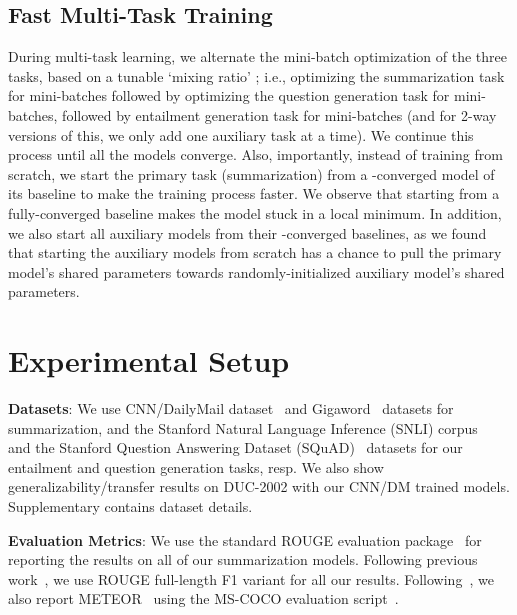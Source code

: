 \documentclass[11pt,a4paper]{article}
\begin{document}
\subsection{Fast Multi-Task Training}
During multi-task learning, we alternate the mini-batch optimization of the three tasks, based on a tunable `mixing ratio' ; i.e., optimizing the summarization task for  mini-batches followed by optimizing the question generation task for  mini-batches, followed by entailment generation task for  mini-batches (and for 2-way versions of this, we only add one auxiliary task at a time). We continue this process  until all the models converge. Also, importantly, instead of training from scratch, we start the primary task (summarization) from a -converged model of its baseline to make the training process faster. We observe that starting from a fully-converged baseline makes the model stuck in a local minimum. In addition, we also start all auxiliary models from their -converged baselines, as we found that starting the auxiliary models from scratch has a chance to pull the primary model's shared parameters towards randomly-initialized auxiliary model's shared parameters.




 
\section{Experimental Setup}
\label{sec-setup}

\label{sec:datasets}
\noindent\textbf{Datasets}: We use CNN/DailyMail dataset~\cite{hermann2015teaching,nallapati2016abstractive} and Gigaword~\cite{rush2015neural} datasets for summarization, and the Stanford Natural Language Inference (SNLI) corpus~\cite{bowman2015large} and the Stanford Question Answering Dataset (SQuAD)~\cite{rajpurkar2016squad} datasets for our entailment and question generation tasks, resp. We also show generalizability/transfer results on DUC-2002 with our CNN/DM trained models. Supplementary contains dataset details.

\noindent\textbf{Evaluation Metrics}: We use the standard ROUGE evaluation package~\cite{lin2004rouge} for reporting the results on all of our summarization models. Following previous work~\cite{chopra2016abstractive,nallapati2016abstractive}, we use ROUGE full-length F1 variant for all our results.
Following~, we also report METEOR~\cite{banerjee2005meteor} using the MS-COCO evaluation script~\cite{chen2015microsoft}.
\end{document}
